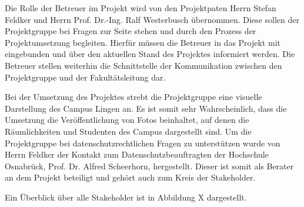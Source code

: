 Die Rolle der Betreuer im Projekt wird von den Projektpaten Herrn Stefan Feldker
und Herrn Prof. Dr.-Ing. Ralf Westerbusch übernommen. Diese sollen der
Projektgruppe bei Fragen zur Seite stehen und durch den Prozess der
Projektumsetzung begleiten. Hierfür müssen die Betreuer in das Projekt mit
eingebunden und über den aktuellen Stand des Projektes informiert werden. Die
Betreuer stellen weiterhin die Schnittstelle der Kommunikation zwischen den
Projektgruppe und der Fakultätsleitung dar.

Bei der Umsetzung des Projektes strebt die Projektgruppe eine visuelle
Darstellung des Campus Lingen an. Es ist somit sehr Wahrscheinlich, dass die
Umsetzung die Veröffentlichung von Fotos beinhaltet, auf denen die
Räumlichkeiten und Studenten des Campus dargestellt sind. Um die Projektgruppe
bei datenschutzrechtlichen Fragen zu unterstützen wurde von Herrn Feldker der
Kontakt zum Datenschutzbeauftragten der Hochschule Osnabrück, Prof. Dr. Alfred
Scheerhorn, hergestellt. Dieser ist somit als Berater an dem Projekt beteiligt
und gehört auch zum Kreis der Stakeholder.

Ein Überblick über alle Stakeholder ist in Abbildung X dargestellt.
